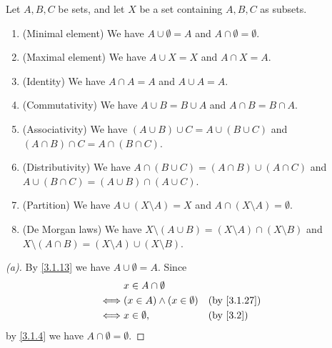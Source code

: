 \begin{prop}\label{3.1.28}
  Let \(A, B, C\) be sets, and let \(X\) be a set containing \(A, B, C\) as subsets.
  \begin{enumerate}
    \item (Minimal element) We have \(A \cup \emptyset = A\) and \(A \cap \emptyset = \emptyset\).
    \item (Maximal element) We have \(A \cup X = X\) and \(A \cap X = A\).
    \item (Identity) We have \(A \cap A = A\) and \(A \cup A = A\).
    \item (Commutativity) We have \(A \cup B = B \cup A\) and \(A \cap B = B \cap A\).
    \item (Associativity) We have \((A \cup B) \cup C = A \cup (B \cup C)\) and \((A \cap B) \cap C = A \cap (B \cap C)\).
    \item (Distributivity) We have \(A \cap (B \cup C) = (A \cap B) \cup (A \cap C)\) and \(A \cup (B \cap C) = (A \cup B) \cap (A \cup C)\).
    \item (Partition) We have \(A \cup (X \setminus A) = X\) and \(A \cap (X \setminus A) = \emptyset\).
    \item (De Morgan laws) We have \(X \setminus (A \cup B) = (X \setminus A) \cap (X \setminus B)\) and \(X \setminus (A \cap B) = (X \setminus A) \cup (X \setminus B)\).
  \end{enumerate}
\end{prop}

\begin{proof}[(a)]
  By \cref{3.1.13} we have \(A \cup \emptyset = A\).
  Since
  \begin{align*}
         & x \in A \cap \emptyset                             \\
    \iff & (x \in A) \land (x \in \emptyset) &  & \by{3.1.27} \\
    \iff & x \in \emptyset,                  &  & \by{3.2}
  \end{align*}
  by \cref{3.1.4} we have \(A \cap \emptyset = \emptyset\).
\end{proof}

